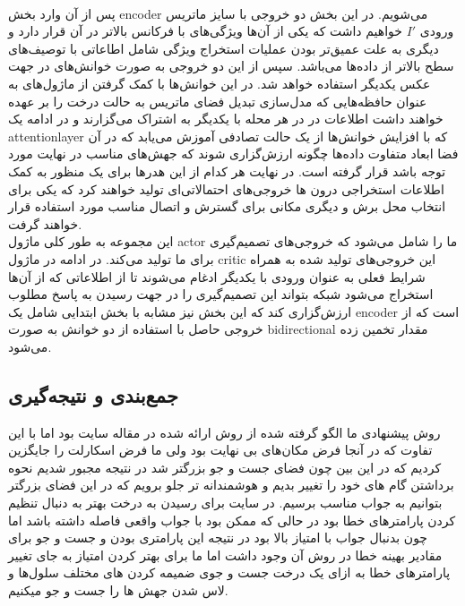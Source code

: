 \\
پس از آن وارد بخش \gls{encoder} می‌شویم. در این بخش دو خروجی با سایز ماتریس ورودی $I'$ خواهیم داشت که یکی از آن‌ها ویژگی‌های با فرکانس بالاتر در آن قرار دارد و دیگری به علت عمیق‌تر بودن عملیات استخراج ویژگی شامل اطاعاتی با توصیف‌های سطح بالاتر از داده‌ها می‌باشد. سپس از این دو خروجی به صورت خوانش‌های در جهت عکس یکدیگر استفاده خواهد شد. در این خوانش‌ها با کمک گرفتن از ماژول‌های  به عنوان حافظه‌هایی که مدل‌سازی تبدیل فضای ماتریس به حالت درخت را بر عهده خواهند داشت اطلاعات در در هر محله با یکدیگر به اشتراک می‌گزارند و در ادامه یک \gls{attentionlayer} که با افزایش خوانش‌ها از یک حالت تصادفی آموزش می‌یابد که در آن فضا ابعاد متفاوت داده‌ها چگونه ارزش‌گزاری شوند که جهش‌‌های مناسب در نهایت مورد توجه باشد قرار گرفته است. در نهایت هر کدام از این هدرها برای یک منظور به کمک اطلاعات استخراجی درون ها خروجی‌های احتمالاتی‌ای تولید خواهند کرد که یکی برای انتخاب محل برش و دیگری مکانی برای گسترش و اتصال مناسب مورد استفاده قرار خواهند گرفت.
\\
این مجموعه به طور کلی ماژول \gls{actor} ما را شامل می‌شود که خروجی‌های تصمیم‌گیری برای ما تولید می‌کند. در ادامه در ماژول \gls{critic} این خروجی‌های تولید شده به همراه شرایط فعلی به عنوان ورودی با یکدیگر ادغام می‌شوند تا از اطلاعاتی که از آن‌ها استخراج می‌شود شبکه بتواند این تصمیم‌گیری را در جهت رسیدن به پاسخ مطلوب ارزش‌گزاری کند که این بخش نیز مشابه با بخش ابتدایی شامل یک \gls{encoder} است که از خروجی حاصل با استفاده از دو خوانش به صورت \gls{bidirectional} مقدار  تخمین زده می‌شود.


\subsection{جمع‌بندی و نتیجه‌گیری}
روش پیشنهادی ما الگو گرفته شده از روش ارائه شده در مقاله سایت بود اما با این تفاوت که در آنجا فرض مکان‌های بی نهایت بود ولی ما فرض اسکارلت را جایگزین کردیم که در این بین چون فضای جست و جو بزرگتر شد در نتیجه مجبور شدیم نحوه برداشتن گام های خود را تغییر بدیم و هوشمندانه تر جلو برویم که در این فضای بزرگتر بتوانیم به جواب مناسب برسیم. در سایت برای رسیدن به درخت بهتر به دنبال تنظیم کردن پارامترهای خطا بود در حالی که ممکن بود با جواب واقعی فاصله داشته باشد اما چون بدنبال جواب با امتیاز بالا بود در نتیجه این پارامتری بودن و جست و جو برای مقادیر بهینه خطا در روش آن وجود داشت اما ما برای بهتر کردن امتیاز به جای تغییر پارامترهای خطا به ازای یک درخت جست و جوی ضمیمه کردن های مختلف سلول‌ها و لاس شدن جهش ها را جست و جو میکنیم.




\newpage

